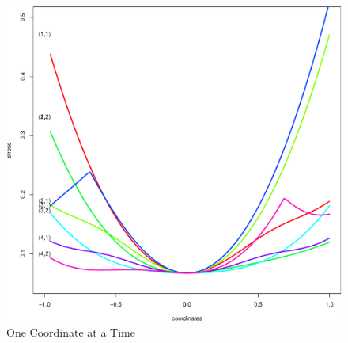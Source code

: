 \documentclass[
  12pt,
  letterpaper,
  DIV=11,
  numbers=noendperiod]{scrreprt}
\theoremstyle{remark}
\begin{document}
\begin{figure}[H]

{\centering \includegraphics{spaces_files/figure-pdf/piccoorc-1.pdf}

}

\caption{One Coordinate at a Time}

\end{figure}%
\end{document}

